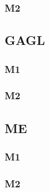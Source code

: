 \documentclass[a4paper,11pt]{article}
\begin{document}
\subsubsection{M2}


\subsection{GAGL}

\subsubsection{M1}

\subsubsection{M2}


\subsection{ME}

\subsubsection{M1}

\subsubsection{M2}
\end{document}
